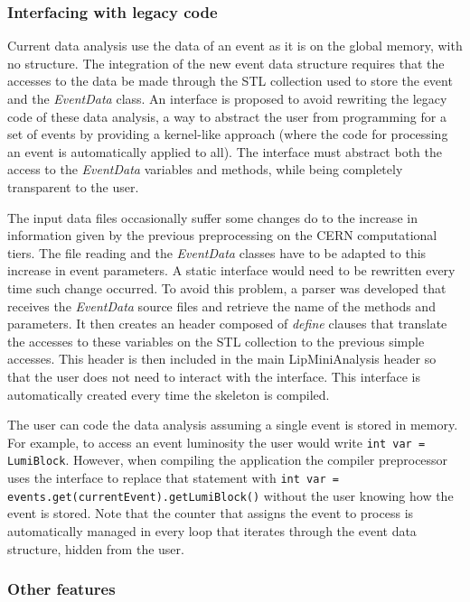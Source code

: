 \subsubsection*{Interfacing with legacy code}

Current data analysis use the data of an event as it is on the global memory, with no structure. The integration of the new event data structure requires that the accesses to the data be made through the STL collection used to store the event and the \textit{EventData} class. An interface is proposed to avoid rewriting the legacy code of these data analysis, a way to abstract the user from programming for a set of events by providing a kernel-like approach (where the code for processing an event is automatically applied to all). The interface must abstract both the access to the \textit{EventData} variables and methods, while being completely transparent to the user.

The input data files occasionally suffer some changes do to the increase in information given by the previous preprocessing on the CERN computational tiers. The file reading and the \textit{EventData} classes have to be adapted to this increase in event parameters. A static interface would need to be rewritten every time such change occurred. To avoid this problem, a parser was developed that receives the \textit{EventData} source files and retrieve the name of the methods and parameters. It then creates an header composed of \textit{define} clauses that translate the accesses to these variables on the STL collection to the previous simple accesses. This header is then included in the main LipMiniAnalysis header so that the user does not need to interact with the interface. This interface is automatically created every time the skeleton is compiled.

The user can code the data analysis assuming a single event is stored in memory. For example, to access an event luminosity the user would write \texttt{int var = LumiBlock}. However, when compiling the application the compiler preprocessor uses the interface to replace that statement with \texttt{int var = events.get(currentEvent).getLumiBlock()} without the user knowing how the event is stored. Note that the counter that assigns the event to process is automatically managed in every loop that iterates through the event data structure, hidden from the user.

\subsubsection*{Other features}

